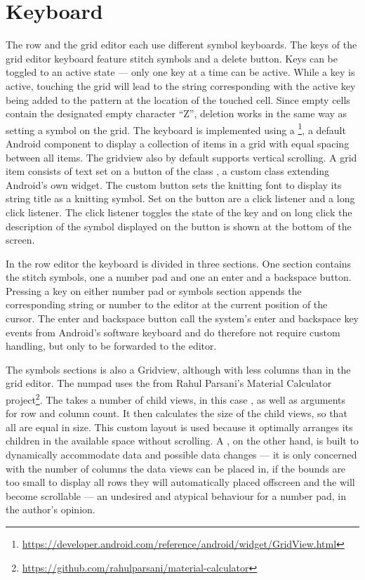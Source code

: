\section{Keyboard}
The row and the grid editor each use different symbol keyboards. The keys of the grid editor keyboard feature stitch symbols and a delete button. Keys can be toggled to an active state --- only one key at a time can be active. While a key is active, touching the grid will lead to the string corresponding with the active key being added to the pattern at the location of the touched cell. Since empty cells contain the designated empty character ``Z'', deletion works in the same way as setting a symbol on the grid. The keyboard is implemented using a \footnote{\url{https://developer.android.com/reference/android/widget/GridView.html}}, a default Android component to display a collection of items in a grid with equal spacing between all items. The gridview also by default supports vertical scrolling. A grid item consists of text set on a button of the class , a custom class extending Android’s own  widget. The custom button sets the knitting font to display its string title as a knitting symbol. Set on the button are a click listener and a long click listener. The click listener toggles the state of the key and on long click the description of the symbol displayed on the button is shown at the bottom of the screen.

In the row editor the keyboard is divided in three sections. One section contains the stitch symbols, one a number pad and one an enter and a backspace button. Pressing a key on either number pad or symbols section appends the corresponding string or number to the editor at the current position of the cursor. The enter and backspace button call the system’s enter and backspace key events from Android’s software keyboard and do therefore not require custom handling, but only to be forwarded to the editor.

The symbols sections is also a Gridview, although with less columns than in the grid editor. The numpad uses the  from Rahul Parsani's Material Calculator project\footnote{\url{https://github.com/rahulparsani/material-calculator}}. The  takes a number of child views, in this case , as well as arguments for row and column count. It then calculates the size of the child views, so that all are equal in size. This custom layout is used because it optimally arranges its children in the available space without scrolling. A , on the other hand, is built to dynamically accommodate data and possible data changes --- it is only concerned with the number of columns the data views can be placed in, if the  bounds are too small to display all rows they will automatically placed offscreen and the  will become scrollable --- an undesired and atypical behaviour for a number pad, in the author's opinion.

